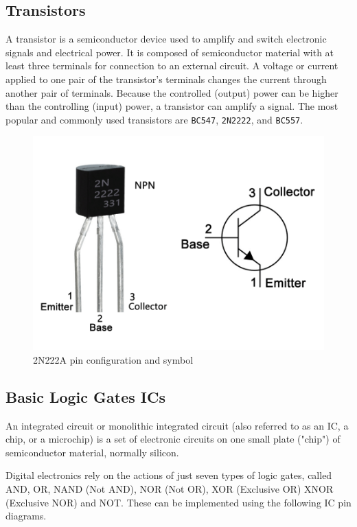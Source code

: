 \subsection*{Transistors}

A transistor is a semiconductor device used to amplify and switch electronic signals and electrical power. It is composed of semiconductor material with at least three terminals for connection to an external circuit. A voltage or current applied to one pair of the transistor's terminals changes the current through another pair of terminals. Because the controlled (output) power can be higher than the controlling (input) power, a transistor can amplify a signal. The most popular and commonly used transistors are \verb|BC547|, \verb|2N2222|, and \verb|BC557|.

\begin{figure}[H]
    \centering
    \includegraphics[width=0.5\linewidth]{img/transistor.png}
    \caption{ 2N222A pin configuration and symbol}
    \label{fig:transistor}
\end{figure}

\subsection*{Basic Logic Gates ICs}

An integrated circuit or monolithic integrated circuit (also referred to as an IC, a chip, or a microchip) is a set of electronic circuits on one small plate ("chip") of semiconductor material, normally silicon.

\vspace{0.25 cm}

\noindent Digital electronics rely on the actions of just seven types of logic gates, called AND, OR, NAND (Not AND), NOR (Not OR), XOR (Exclusive OR) XNOR (Exclusive NOR) and NOT. These can be implemented using the following IC pin diagrams.

